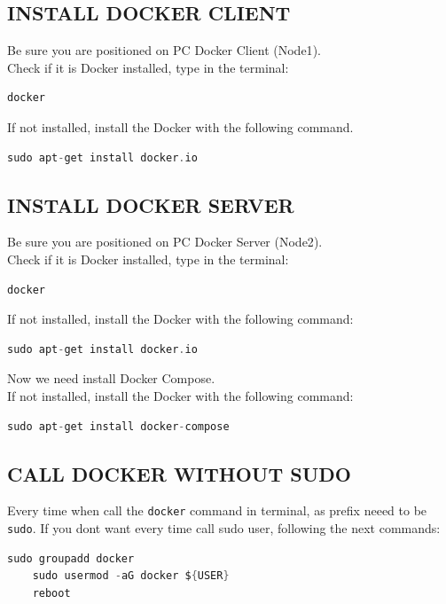 \documentclass[12pt]{report}
\newcommand{\code}[1]{\texttt{#1}} %
\newcommand{\mygreen}[1]{{\color{my_green}#1}}
\newcommand{\myred}[1]{{\color{my_red}#1}}
\begin{document}
\subsection{INSTALL DOCKER CLIENT}
Be sure you are positioned on PC Docker Client (\mygreen{Node1}).\\
Check if it is Docker installed, type in the terminal:
\begin{lstlisting}[language=C]
docker
\end{lstlisting}
If not installed, install the Docker with the following command.
\begin{lstlisting}[language=C, caption= Install docker engine on Node1.]
sudo apt-get install docker.io
\end{lstlisting}



\subsection{INSTALL DOCKER SERVER}
Be sure you are positioned on PC Docker Server (\myred{Node2}).\\
Check if it is Docker installed, type in the terminal:
\begin{lstlisting}[language=C]
docker
\end{lstlisting}
If not installed, install the Docker with the following command:
\begin{lstlisting}[language=C, caption= Install docker engine on Node2.]
sudo apt-get install docker.io
\end{lstlisting}
Now we need install Docker Compose. \\
If not installed, install the Docker with the following command:
\begin{lstlisting}[language=C, caption= Install Docker Compose on Node2.]
sudo apt-get install docker-compose
\end{lstlisting}



\subsection{CALL DOCKER WITHOUT SUDO}
Every time when call the \code{docker} command in terminal, as prefix neeed to be \code{sudo}.
If you dont want every time call sudo user, following the next commands:
\begin{lstlisting}[language=C, caption= Make call docker without sudo user.]
	sudo groupadd docker
	sudo usermod -aG docker ${USER}
	reboot
\end{lstlisting}
\end{document}
